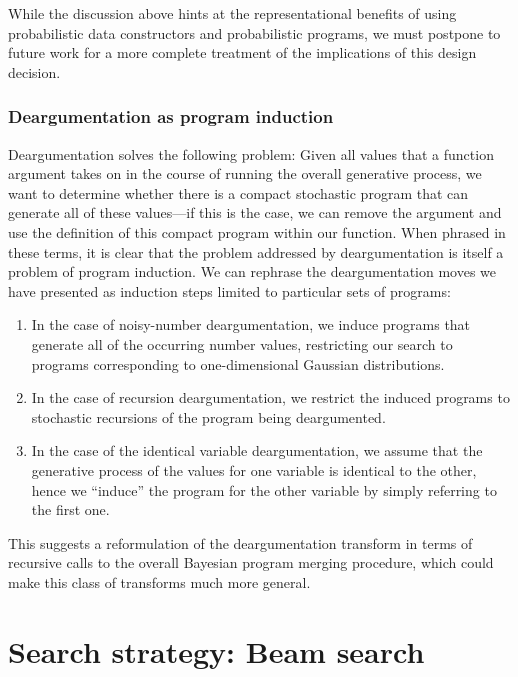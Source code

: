 \documentclass[a4paper,10pt]{article}
\begin{document}
While the discussion above hints at the representational benefits of using probabilistic data constructors and probabilistic programs, we must postpone to future work for a more complete treatment of the implications of this design decision.


\subsubsection{Deargumentation as program induction}
\label{sec:dearg-as-induction}

Deargumentation solves the following problem: Given all values that a function argument takes on in the course of running the overall generative process, we want to determine whether there is a compact stochastic program that can generate all of these values---if this is the case, we can remove the argument and use the definition of this compact program within our function. When phrased in these terms, it is clear that the problem addressed by deargumentation is itself a problem of program induction. We can rephrase the deargumentation moves we have presented as induction steps limited to particular sets of programs:

\begin{enumerate}
\item In the case of noisy-number deargumentation, we induce programs that generate all of the occurring number values, restricting our search to programs corresponding to one-dimensional Gaussian distributions.
\item In the case of recursion deargumentation, we restrict the induced programs to stochastic recursions of the program being deargumented.
\item In the case of the identical variable deargumentation, we assume that the generative process of the values for one variable is identical to the other, hence we ``induce'' the program for the other variable by simply referring to the first one.
\end{enumerate}

This suggests a reformulation of the deargumentation transform in terms of recursive calls to the overall Bayesian program merging procedure, which could make this class of transforms much more general.


\newpage
\section{Search strategy: Beam search}
\end{document}
